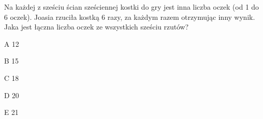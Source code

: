 \begin{tresc}
Na każdej z sześciu ścian sześciennej kostki do gry jest inna liczba oczek (od 1 do 6 oczek). Joasia rzuciła kostką 6 razy, za każdym razem otrzymując inny wynik. Jaka jest łączna liczba oczek ze wszystkich sześciu rzutów?
\end{tresc}
\begin{wariant}{A} 12 \end{wariant}
\begin{wariant}{B} 15 \end{wariant}
\begin{wariant}{C} 18 \end{wariant}
\begin{wariant}{D} 20 \end{wariant}
\begin{wariant}{E} 21 \end{wariant}
